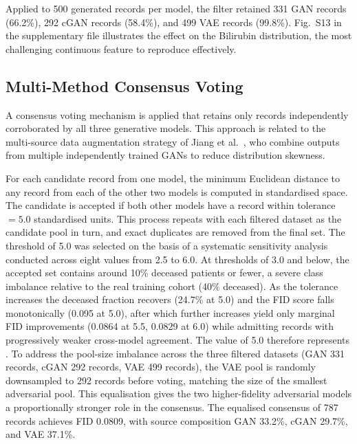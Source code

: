 Applied to 500 generated records per model, the filter retained 331 GAN records (66.2\%), 292 cGAN records (58.4\%), and 499 VAE records (99.8\%). Fig.~S13 in the supplementary file illustrates the effect on the Bilirubin distribution, the most challenging continuous feature to reproduce effectively.

\subsection{Multi-Method Consensus Voting}

A consensus voting mechanism is applied that retains only records independently corroborated by all three generative models. This approach is related to the multi-source data augmentation strategy of Jiang et al.\ \cite{jiang2023}, who combine outputs from multiple independently trained GANs to reduce distribution skewness. 

 For each candidate record from one model, the minimum Euclidean distance to any record from each of the other two models is computed in standardised space. The candidate is accepted if both other models have a record within tolerance~$= 5.0$ standardised units. This process repeats with each filtered dataset as the candidate pool in turn, and exact duplicates are removed from the final set. The threshold of 5.0 was selected on the basis of a systematic sensitivity analysis conducted across eight values from 2.5 to 6.0. At thresholds of 3.0 and below, the accepted set contains around 10\% deceased patients or fewer, a severe class imbalance relative to the real training cohort (40\% deceased). As the tolerance increases the deceased fraction recovers (24.7\% at 5.0) and the FID score falls monotonically (0.095 at 5.0), after which further increases yield only marginal FID improvements (0.0864 at 5.5, 0.0829 at 6.0) while admitting records with progressively weaker cross-model agreement. The value of 5.0 therefore represents . To address the pool-size imbalance across the three filtered datasets (GAN 331 records, cGAN 292 records, VAE 499 records), the VAE pool is randomly downsampled to 292 records before voting, matching the size of the smallest adversarial pool. This equalisation gives the two higher-fidelity adversarial models a proportionally stronger role in the consensus. The equalised consensus of 787 records achieves FID 0.0809, with source composition GAN 33.2\%, cGAN 29.7\%, and VAE 37.1\%.

